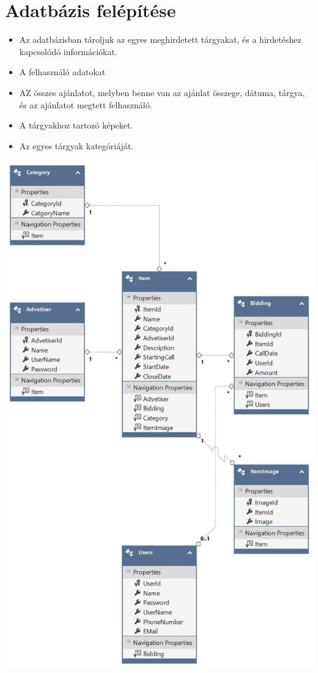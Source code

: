 \documentclass[12pt,a4paper]{article}
\begin{document}
\section{Adatbázis felépítése}
\begin{itemize}
\item Az adatbázisban tároljuk az egyes meghirdetett tárgyakat, és a hirdetéshez kapcsolódó információkat.
\item A felhasználó adatokat
\item AZ összes ajánlatot, melyben benne van az ajánlat összege, dátuma, tárgya, és az ajánlatot megtett felhasználó.
\item A tárgyakhoz tartozó képeket.
\item Az egyes tárgyak kategóriáját.
\end{itemize}
\includegraphics[scale=0.5]{entity_connect.jpg}
\end{document}
